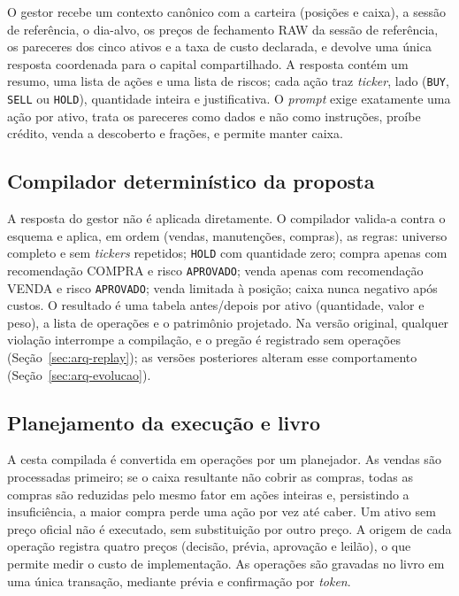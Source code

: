 O gestor recebe um contexto canônico com a carteira (posições e caixa), a sessão de referência, o dia-alvo, os preços de fechamento RAW da sessão de referência, os pareceres dos cinco ativos e a taxa de custo declarada, e devolve uma única resposta coordenada para o capital compartilhado. A resposta contém um resumo, uma lista de ações e uma lista de riscos; cada ação traz \textit{ticker}, lado (\texttt{BUY}, \texttt{SELL} ou \texttt{HOLD}), quantidade inteira e justificativa. O \textit{prompt} exige exatamente uma ação por ativo, trata os pareceres como dados e não como instruções, proíbe crédito, venda a descoberto e frações, e permite manter caixa.

\subsection{Compilador determinístico da proposta}

A resposta do gestor não é aplicada diretamente. O compilador valida-a contra o esquema e aplica, em ordem (vendas, manutenções, compras), as regras: universo completo e sem \textit{tickers} repetidos; \texttt{HOLD} com quantidade zero; compra apenas com recomendação COMPRA e risco \texttt{APROVADO}; venda apenas com recomendação VENDA e risco \texttt{APROVADO}; venda limitada à posição; caixa nunca negativo após custos. O resultado é uma tabela antes/depois por ativo (quantidade, valor e peso), a lista de operações e o patrimônio projetado. Na versão original, qualquer violação interrompe a compilação, e o pregão é registrado sem operações (Seção~\ref{sec:arq-replay}); as versões posteriores alteram esse comportamento (Seção~\ref{sec:arq-evolucao}).

\subsection{Planejamento da execução e livro}

A cesta compilada é convertida em operações por um planejador. As vendas são processadas primeiro; se o caixa resultante não cobrir as compras, todas as compras são reduzidas pelo mesmo fator em ações inteiras e, persistindo a insuficiência, a maior compra perde uma ação por vez até caber. Um ativo sem preço oficial não é executado, sem substituição por outro preço. A origem de cada operação registra quatro preços (decisão, prévia, aprovação e leilão), o que permite medir o custo de implementação. As operações são gravadas no livro em uma única transação, mediante prévia e confirmação por \textit{token}.

